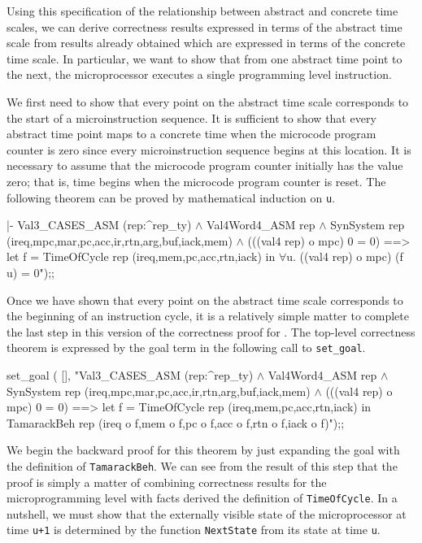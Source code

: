 Using this specification of the relationship between
abstract and concrete time scales,
we can derive
correctness results expressed in terms of the abstract time scale
from results already obtained which are expressed in terms
of the concrete time scale.
In particular, we want to show that
from one abstract time point to the next,
the microprocessor executes a single programming level instruction.

We first need to show that every point on the abstract
time scale corresponds to the start of a microinstruction sequence.
It is sufficient to show that every abstract time point maps to
a concrete time when the microcode program counter is zero since
every microinstruction sequence begins at this location.
It is necessary to assume that the microcode program counter
initially has the value zero; that is, time begins when the microcode
program counter is reset.
The following theorem can be proved by mathematical induction on \verb"u".

\begintt
|- Val3_CASES_ASM (rep:^rep_ty) \(\wedge\)
   Val4Word4_ASM rep \(\wedge\)
   SynSystem rep (ireq,mpc,mar,pc,acc,ir,rtn,arg,buf,iack,mem) \(\wedge\)
   (((val4 rep) o mpc) 0 = 0)
   ==>
   let f = TimeOfCycle rep (ireq,mem,pc,acc,rtn,iack) in
   \(\forall\)u. ((val4 rep) o mpc) (f u) = 0");;
\endtt

Once we have shown that every point on the abstract time scale
corresponds to the beginning of an instruction cycle,
it is a relatively simple matter to complete the last step in
this version of the correctness proof for \Tamarack.
The top-level correctness theorem is expressed by the
goal term in the following call to \verb"set_goal".

\begintt
set_goal (
  [],
  "Val3_CASES_ASM (rep:^rep_ty) \(\wedge\)
   Val4Word4_ASM rep \(\wedge\)
   SynSystem rep (ireq,mpc,mar,pc,acc,ir,rtn,arg,buf,iack,mem) \(\wedge\)
   (((val4 rep) o mpc) 0 = 0)
   ==>
   let f = TimeOfCycle rep (ireq,mem,pc,acc,rtn,iack) in
   TamarackBeh rep (ireq o f,mem o f,pc o f,acc o f,rtn o f,iack o f)");;
\endtt

We begin the backward proof for this theorem
by just expanding the goal with the definition of \verb"TamarackBeh".
We can see from the result of this step that
the proof is simply a matter
of combining correctness results for the microprogramming level
with facts derived the definition of \verb"TimeOfCycle".
In a nutshell, we must show that
the externally visible state of the microprocessor at time \verb"u+1"
is determined by the function \verb"NextState" from its state
at time \verb"u".

